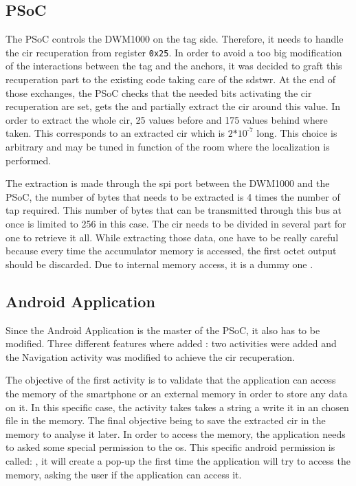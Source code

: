 \subsection{PSoC}

The PSoC controls the DWM1000 on the tag side. Therefore, it needs to handle the \gls{cir} recuperation from register \texttt{0x25}. In order to avoid a too big modification of the interactions between the tag and the anchors, it was decided to graft this recuperation part to the existing code taking care of the \gls{sdstwr}. At the end of those exchanges, the PSoC checks that the needed bits activating the \gls{cir} recuperation are set, gets the  and partially extract the \gls{cir} around this value. In order to extract the whole \gls{cir}, 25 values before and 175 values behind where taken. This corresponds to an extracted \gls{cir} which is $\text{2*10}^\text{-7}$  long. This choice is arbitrary and may be tuned in function of the room where the localization is performed.
\vspace{2mm}

The extraction is made through the \gls{spi} port between the DWM1000 and the PSoC, the number of bytes that needs to be extracted is 4 times the number of tap required. This number of bytes that can be transmitted through this bus at once is limited to 256 in this case. The \gls{cir} needs to be divided in several part for one to retrieve it all. While extracting those data, one have to be really careful because every time the accumulator memory is accessed, the first octet output should be discarded. Due to internal memory access, it is a dummy one \cite{usermanual}.

\subsection{Android Application}

Since the Android Application is the master of the PSoC, it also has to be modified. Three different features where added : two activities were added and the Navigation activity was modified to achieve the \gls{cir} recuperation. 
\vspace{2mm}

The objective of the first activity is to validate that the application can access the memory of the smartphone or an external memory in order to store any data on it. In this specific case, the activity takes takes a string a write it in an chosen file in the memory. The final objective being to save the extracted \gls{cir} in the memory to analyse it later. In order to access the memory, the application needs to asked some special permission to the \gls{os}. This specific android permission is called: , it will create a pop-up the first time the application will try to access the memory, asking the user if the application can access it.
\vspace{2mm}

